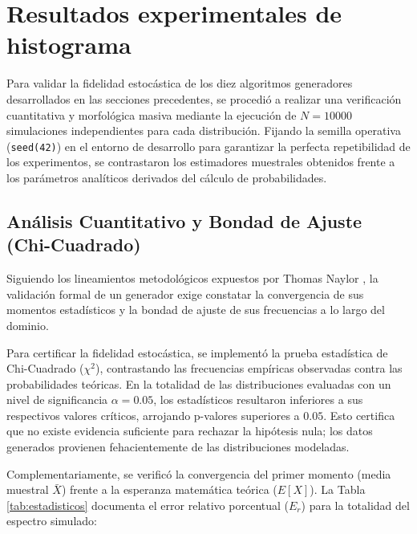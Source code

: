 \documentclass{article}
\begin{document}
\section{Resultados experimentales de histograma}
Para validar la fidelidad estocástica de los diez algoritmos generadores desarrollados en las secciones precedentes, se procedió a realizar una verificación cuantitativa y morfológica masiva mediante la ejecución de $N = 10000$ simulaciones independientes para cada distribución. Fijando la semilla operativa (\texttt{seed(42)}) en el entorno de desarrollo para garantizar la perfecta repetibilidad de los experimentos, se contrastaron los estimadores muestrales obtenidos frente a los parámetros analíticos derivados del cálculo de probabilidades.

\subsection{Análisis Cuantitativo y Bondad de Ajuste (Chi-Cuadrado)}
Siguiendo los lineamientos metodológicos expuestos por Thomas Naylor \cite{naylor}, la validación formal de un generador exige constatar la convergencia de sus momentos estadísticos y la bondad de ajuste de sus frecuencias a lo largo del dominio.

Para certificar la fidelidad estocástica, se implementó la prueba estadística de Chi-Cuadrado ($\chi^2$), contrastando las frecuencias empíricas observadas contra las probabilidades teóricas. En la totalidad de las distribuciones evaluadas con un nivel de significancia $\alpha = 0.05$, los estadísticos resultaron inferiores a sus respectivos valores críticos, arrojando p-valores superiores a $0.05$. Esto certifica que no existe evidencia suficiente para rechazar la hipótesis nula; los datos generados provienen fehacientemente de las distribuciones modeladas.

Complementariamente, se verificó la convergencia del primer momento (media muestral $\bar{X}$) frente a la esperanza matemática teórica ($E[X]$). La Tabla \ref{tab:estadisticos} documenta el error relativo porcentual ($E_r$) para la totalidad del espectro simulado:
\end{document}
